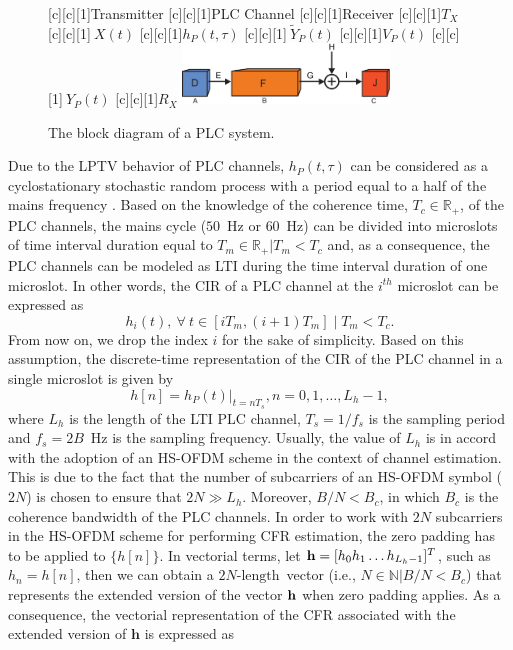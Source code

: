 \documentclass[journal]{IEEEtran}
\begin{document}
\begin{figure}[h]
	\centering
	[c][1]{Transmitter}
	[c][1]{PLC Channel}
	[c][1]{Receiver}
	[c][1]{$T_X$}
	[c][1]{$~X(t)$}
	[c][1]{$h_P(t,\tau)$}
	[c][1]{$~\tilde{Y}_P(t)$}
	[c][1]{$V_P(t)$}
	[c][1]{$~Y_P(t)$}
	[c][1]{$R_X$}
	\includegraphics[width=0.49\textwidth]{images/PLCchannel.eps}
	\caption{The block diagram of a PLC system.}
	\label{PLCchannel}
\end{figure}

Due to the \ac{LPTV} behavior of \ac{PLC} channels, $h_P(t,\tau)$ can be considered as a cyclostationary stochastic random process with a period equal to a half of the mains frequency \cite{Colen:TCRA}. Based on the knowledge of the coherence time, $T_c \in \mathbb{R}_+$, of the \ac{PLC} channels, the mains cycle ($50$~Hz or $60$~Hz) can be divided into microslots of time interval duration equal to $T_m\in \mathbb{R}_+|T_m < T_c$ and, as a consequence, the \ac{PLC} channels can be modeled as \ac{LTI} during the time interval duration of one microslot. In other words, the \ac{CIR} of a \ac{PLC} channel at the $i^{th}$ microslot can be expressed as
\begin{equation} \label{discreteh}
h_{i}(t),~\forall~t \in [iT_{m}, (i+1)T_{m}] \mid T_{m} < T_{c}.
\end{equation}
From now on, we drop the index $i$ for the sake of simplicity. Based on this assumption, the discrete-time representation of the \ac{CIR} of the \ac{PLC} channel in a single microslot is given by
\begin{equation} \label{discreteCFR}
h[n] = h_P(t)|_{t=nT_s} , n = 0,1, \ldots, L_h-1, 
\end{equation}
where $L_{h}$ is the length of the \ac{LTI} \ac{PLC} channel, $T_s=1/f_s$ is the sampling period and $f_s=2B$~Hz is the sampling frequency. Usually, the value of $L_{h}$ is in accord with the adoption of an \ac{HS-OFDM} scheme in the context of channel estimation. This is due to the fact that the number of subcarriers of an \ac{HS-OFDM} symbol ($2N$) is chosen to ensure that $2N \gg L_h$. Moreover, $B/N < B_c$, in which $B_c$ is the coherence bandwidth of the \ac{PLC} channels. In order to work with $2N$ subcarriers in the \ac{HS-OFDM} scheme for performing \ac{CFR} estimation, the zero padding has to be applied to $\{h[n]\}$. In vectorial terms, let ${\bf h}=[h_0 h_1 \ldots h_{L_h-1}]^T$, such as $h_n=h[n]$, then we can obtain a $2N\text{-length}$~vector (i.e., $N\in \mathbb{N}|B/N<B_c$) that represents the extended version of the vector ${\bf h}$ when zero padding applies. As a consequence, the vectorial representation of the \ac{CFR} associated with the extended version of $\mathbf{h}$ is expressed as
\end{document}
